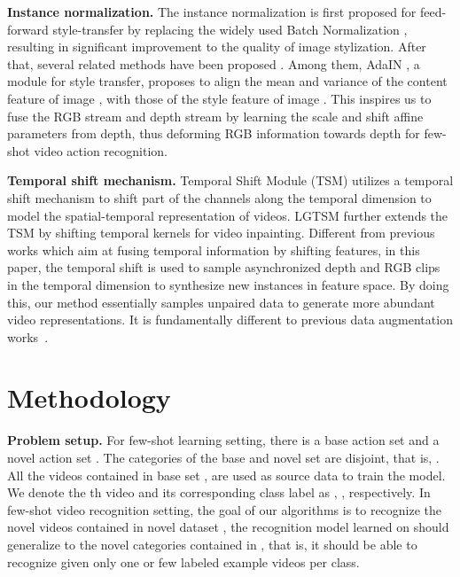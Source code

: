 \documentclass[sigconf]{acmart}
\begin{document}
	
	\noindent \textbf{Instance normalization.} 
	The instance normalization \cite{ulyanov2017improved} is first proposed for feed-forward style-transfer \cite{gatys2016image, huang2017arbitrary} by replacing the widely used Batch Normalization \cite{ioffe2015batch}, resulting in significant improvement to the quality of image stylization. 
	After that, several related methods have been proposed \cite{huang2017arbitrary,Huang_2018_ECCV,Park_2019_CVPR,qian2020long}. 
	Among them, AdaIN \cite{huang2017arbitrary}, a module for style transfer, proposes to align the mean and variance of the content feature of image , with those of the style feature of image . 
	This inspires us to fuse the RGB stream and depth stream by learning the scale and shift affine parameters from depth, thus deforming RGB information towards depth for few-shot video action recognition.
	
	
	\noindent \textbf{Temporal shift mechanism.}
	Temporal Shift Module (TSM) \cite{lin2019tsm} utilizes a temporal shift mechanism to shift part of the channels along the temporal dimension to model the spatial-temporal representation of videos. LGTSM \cite{chang2019learnable} further extends the TSM by shifting temporal kernels for video inpainting.  
	Different from previous works which aim at fusing temporal information by shifting features, in this paper, the temporal shift is used to sample asynchronized depth and RGB clips in the temporal dimension to synthesize new instances in feature space.
	By doing this, our method essentially samples unpaired data to generate more abundant video representations. It is fundamentally different to previous data augmentation works~\cite{chen2019image, chen2019imageMeta, fu2019embodied,zhong2017random,hariharan2017low, wang2018low, schwartz2018delta, gao2018low}.
	
	
	
	
	
	
	
	
	
	
	


	\section{Methodology}
	
	\noindent  \textbf{Problem setup.} 
	For few-shot learning setting, there is a base action set  and a novel action set . 
	The categories of the base and novel set are disjoint, that is,  . 
	All the videos contained in base set  , are used as source data to train the model.
	We denote the th video and its corresponding class label as , , respectively. 
	In few-shot video recognition setting, the goal of our algorithms is to recognize the novel videos contained in novel dataset , the recognition model learned on   should generalize to the novel categories contained in , that is, it should be able to recognize  given only one or few labeled example videos per class.
	
\end{document}
